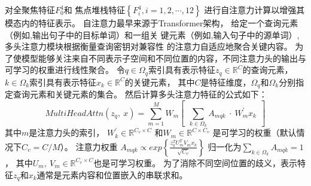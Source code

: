 对全聚焦特征$ F_{0}^{4} $和
焦点堆栈特征$ \left \{ F_{i}^{4}, i=1,2, \cdots, 12 \right \}$
进行自注意力计算以增强其模态内的特征表示。
自注意力最早来源于Transformer架构，
给定一个查询元素（例如,输出句子中的目标单词）和一组关
键元素（例如,输入句子中的源单词）,多头注意力模块根据衡量查询密钥对兼容性
的注意力自适应地聚合关键内容。
为了使模型能够关注来自不同表示子空间和不同位置的内容，不同注意力头的输出与可学习的权重进行线性聚合。
%
%
%
%
%
%
%
%
%
令$q\in \Omega_{q}$索引具有表示特征$z_{q} \in \mathbb{R}^{C}$的查询元素，
$k\in \Omega_{k}$索引具有表示特征$x_{k} \in \mathbb{R}^{C}$的关键元素，
其中$C$是特征维度，$\Omega_{q}$和$\Omega_{k}$分别指定查询元素和关键元素的集合。
然后计算多头注意力特征的公式如下：
% 
% 
% 
% 
\begin{equation}
	MultiHeadAttn(z_{q},~x)=\sum_{m=1}^{M}
	W_{m}\left [ ~~\sum_{k\in \Omega_{k}}^{}A_{mqk} ~\cdot~ W_{m}^{'} x_{k}  ~~\right ]  
\end{equation}
% 
% 
% 
% 
其中$m$是注意力头的索引，
$ W_{k}^{{}' } \in \mathbb{R}^{C_{v} \times C} $
和$W_{m} \in \mathbb{R}^{C\times C_{v} }$
是可学习的权重（默认情况下$C_{v}=C/M$）。
注意力权重 
$A_{mqk} \propto exp \left \{ 
\frac{
	z_{q}^{T} U_{m}^{T} V_{m} x_{k}
}{ \sqrt{C_{v}}
}  \right \} $
% 
% 
% 
归一化为$ {\textstyle \sum_{k\in\Omega_{k}}^{}} A_{mqk} = 1$，
其中$U_{m},~V_{m} \in \mathbb{R}^{C_{v}\times C}$也是可学习权重。
为了消除不同空间位置的歧义，表示特征$z_{q}$和$x_{k}$通常是元素内容和位置嵌入的串联求和。





